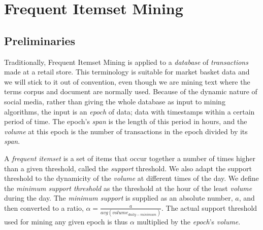 \documentclass{sig-alternate}
\begin{document}



\section{Frequent Itemset Mining}
\label{sec:fim}
\subsection{Preliminaries}
Traditionally, Frequent Itemset Mining is applied to a \emph{database} of \emph{transactions} made at a retail store. This terminology is suitable for market basket data and we will stick to it out of convention, even though we are mining text where the terms corpus and document are normally used. Because of the dynamic nature of social media, rather than giving the whole database as input to mining algorithms, the input is an \emph{epoch} of data; data with timestamps within a certain period of time. The epoch's \emph{span} is the length of this period in hours, and the \emph{volume} at this epoch is the number of transactions in the epoch divided by its \emph{span}.

A \emph{frequent itemset} is a set of items that occur together a number of times higher than a given threshold, called the \emph{support} threshold. We also adapt the support threshold to the dynamicity of the \emph{volume} at different times of the day. We define the \emph{minimum support threshold} as the threshold at the hour of the least \emph{volume} during the day.  The \emph{minimum support} is supplied as an absolute number, $a$, and then converted to a ratio, $\alpha = \frac{a}{avg(volume_{daily-minimum})}$.
The actual support threshold used for mining any given epoch is thus $\alpha$ multiplied by the \emph{epoch}'s \emph{volume}. 

\end{document}
